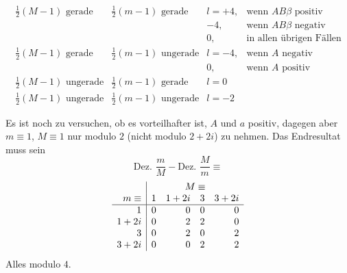 \begingroup\small\setlength{\arraycolsep}{3pt}
\[
\begin{array}{ll|ll}
\frac12(M-1)\text{ gerade}&\frac12(m-1)\text{ gerade}&l=+4,&\text{wenn }AB\beta\text{ positiv}\\
&&-4,&\text{wenn }AB\beta\text{ negativ}\\
&&0,&\text{in allen übrigen Fällen}\\[3pt]
\frac12(M-1)\text{ gerade}&\frac12(m-1)\text{ ungerade}&l=-4,&\text{wenn }A\text{ negativ}\\
&&0,&\text{wenn }A\text{ positiv}\\[3pt]
\frac12(M-1)\text{ ungerade}&\frac12(m-1)\text{ gerade}&l=0&\\[3pt]
\frac12(M-1)\text{ ungerade}&\frac12(m-1)\text{ ungerade}&l=-2&
\end{array}
\]
\endgroup

Es ist noch zu versuchen, ob es vorteilhafter ist, $A$ und $a$ positiv, dagegen aber $m\equiv1$, $M\equiv1$ nur modulo $2$ (nicht modulo $2+2i$) zu nehmen. Das Endresultat muss sein
\[
\text{Dez. }\frac mM-\text{Dez. }\frac Mm\equiv
\]
\[
\begin{array}{r|rrrr}
&\multicolumn{4}{c}{M\equiv}\\
m\equiv&1&1+2i&3&3+2i\\\hline
1&0&0&0&0\\
1+2i&0&2&2&0\\
3&0&2&0&2\\
3+2i&0&0&2&2
\end{array}
\]
Alles modulo $4$.

